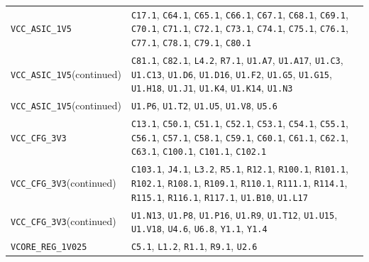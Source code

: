 \documentclass[11pt,a4paper]{article}
\begin{document}
\begin{longtable}{@{}P{49mm}P{123mm}@{}}
\nolinkurl{VCC_ASIC_1V5} & \nolinkurl{C17.1}, \nolinkurl{C64.1}, \nolinkurl{C65.1}, \nolinkurl{C66.1}, \nolinkurl{C67.1}, \nolinkurl{C68.1}, \nolinkurl{C69.1}, \nolinkurl{C70.1}, \nolinkurl{C71.1}, \nolinkurl{C72.1}, \nolinkurl{C73.1}, \nolinkurl{C74.1}, \nolinkurl{C75.1}, \nolinkurl{C76.1}, \nolinkurl{C77.1}, \nolinkurl{C78.1}, \nolinkurl{C79.1}, \nolinkurl{C80.1} \\
\nolinkurl{VCC_ASIC_1V5}\newline (continued) & \nolinkurl{C81.1}, \nolinkurl{C82.1}, \nolinkurl{L4.2}, \nolinkurl{R7.1}, \nolinkurl{U1.A7}, \nolinkurl{U1.A17}, \nolinkurl{U1.C3}, \nolinkurl{U1.C13}, \nolinkurl{U1.D6}, \nolinkurl{U1.D16}, \nolinkurl{U1.F2}, \nolinkurl{U1.G5}, \nolinkurl{U1.G15}, \nolinkurl{U1.H18}, \nolinkurl{U1.J1}, \nolinkurl{U1.K4}, \nolinkurl{U1.K14}, \nolinkurl{U1.N3} \\
\nolinkurl{VCC_ASIC_1V5}\newline (continued) & \nolinkurl{U1.P6}, \nolinkurl{U1.T2}, \nolinkurl{U1.U5}, \nolinkurl{U1.V8}, \nolinkurl{U5.6} \\
\nolinkurl{VCC_CFG_3V3} & \nolinkurl{C13.1}, \nolinkurl{C50.1}, \nolinkurl{C51.1}, \nolinkurl{C52.1}, \nolinkurl{C53.1}, \nolinkurl{C54.1}, \nolinkurl{C55.1}, \nolinkurl{C56.1}, \nolinkurl{C57.1}, \nolinkurl{C58.1}, \nolinkurl{C59.1}, \nolinkurl{C60.1}, \nolinkurl{C61.1}, \nolinkurl{C62.1}, \nolinkurl{C63.1}, \nolinkurl{C100.1}, \nolinkurl{C101.1}, \nolinkurl{C102.1} \\
\nolinkurl{VCC_CFG_3V3}\newline (continued) & \nolinkurl{C103.1}, \nolinkurl{J4.1}, \nolinkurl{L3.2}, \nolinkurl{R5.1}, \nolinkurl{R12.1}, \nolinkurl{R100.1}, \nolinkurl{R101.1}, \nolinkurl{R102.1}, \nolinkurl{R108.1}, \nolinkurl{R109.1}, \nolinkurl{R110.1}, \nolinkurl{R111.1}, \nolinkurl{R114.1}, \nolinkurl{R115.1}, \nolinkurl{R116.1}, \nolinkurl{R117.1}, \nolinkurl{U1.B10}, \nolinkurl{U1.L17} \\
\nolinkurl{VCC_CFG_3V3}\newline (continued) & \nolinkurl{U1.N13}, \nolinkurl{U1.P8}, \nolinkurl{U1.P16}, \nolinkurl{U1.R9}, \nolinkurl{U1.T12}, \nolinkurl{U1.U15}, \nolinkurl{U1.V18}, \nolinkurl{U4.6}, \nolinkurl{U6.8}, \nolinkurl{Y1.1}, \nolinkurl{Y1.4} \\
\nolinkurl{VCORE_REG_1V025} & \nolinkurl{C5.1}, \nolinkurl{L1.2}, \nolinkurl{R1.1}, \nolinkurl{R9.1}, \nolinkurl{U2.6} \\
\end{longtable}\endgroup
\end{document}
